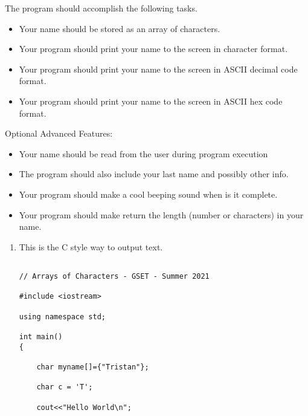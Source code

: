 \documentclass[12pt]{article}
\begin{document}
\begin{description}[labelindent=1cm]
The program should accomplish the following tasks. 


\begin{itemize}

	\item Your name should be stored as an array of characters.

	\item Your program should print your name to the screen in character format.
	
	\item Your program should print your name to the screen in ASCII decimal code format.
	
	\item Your program should print your name to the screen in ASCII hex code format.

\end{itemize}	 
	Optional Advanced Features:
\begin{itemize}
	\item Your name should be read from the user during program execution
		
	\item The program should also include your last name and possibly other info.
    
    \item Your program should make a cool beeping sound when is it complete.
    
    \item Your program should make return the length (number or characters) in your name.
    
\end{itemize}	
\newpage

\item[\textbf{\underline{Example Code:}}] \hfill \vspace{0mm}
\begin{enumerate}
    \item This is the C style way to output text.
	\begin{lstlisting}

// Arrays of Characters - GSET - Summer 2021 
	
#include <iostream>

using namespace std;

int main()
{

	char myname[]={"Tristan"};
	
	char c = 'T';
	
	cout<<"Hello World\n";
	

\end{lstlisting}
\end{enumerate}
\end{description}
\end{document}
